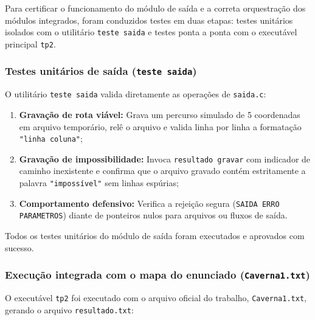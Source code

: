 \documentclass[12pt,a4paper]{article}
\makeatletter
\DeclareRobustCommand{\_}{%
  \ifmmode
    \nfss@text{\textunderscore}%
  \else
    \textunderscore\allowbreak
  \fi
}
\makeatother
\begin{document}
Para certificar o funcionamento do módulo de saída e a correta orquestração dos módulos integrados, foram conduzidos testes em duas etapas: testes unitários isolados com o utilitário \texttt{teste\_saida} e testes ponta a ponta com o executável principal \texttt{tp2}.

\subsubsection*{Testes unitários de saída (\texttt{teste\_saida})}

O utilitário \texttt{teste\_saida} valida diretamente as operações de \texttt{saida.c}:
\begin{enumerate}
    \item \textbf{Gravação de rota viável:} Grava um percurso simulado de 5 coordenadas em arquivo temporário, relê o arquivo e valida linha por linha a formatação \texttt{"linha coluna"};
    \item \textbf{Gravação de impossibilidade:} Invoca \texttt{resultado\_gravar} com indicador de caminho inexistente e confirma que o arquivo gravado contém estritamente a palavra \texttt{"impossível"} sem linhas espúrias;
    \item \textbf{Comportamento defensivo:} Verifica a rejeição segura (\texttt{SAIDA\_ERRO\_PARAMETROS}) diante de ponteiros nulos para arquivos ou fluxos de saída.
\end{enumerate}

Todos os testes unitários do módulo de saída foram executados e aprovados com sucesso.

\subsubsection*{Execução integrada com o mapa do enunciado (\texttt{Caverna1.txt})}

O executável \texttt{tp2} foi executado com o arquivo oficial do trabalho, \texttt{Caverna1.txt}, gerando o arquivo \texttt{resultado.txt}:
\end{document}
